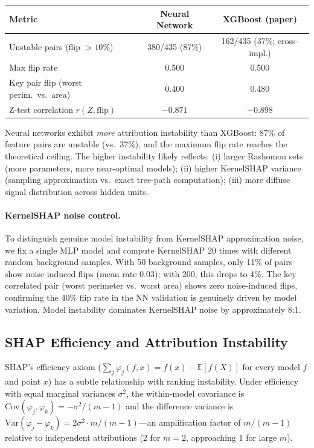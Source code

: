 \documentclass{jmlr}
\newcommand{\E}{\mathbb{E}}
\newcommand{\Var}{\mathrm{Var}}
\begin{document}
\begin{center}
\small
\begin{tabular}{@{}lcc@{}}
\toprule
Metric & Neural Network & XGBoost (paper) \\
\midrule
Unstable pairs (flip $> 10\%$) & 380/435 (87\%) & 162/435 (37\%; cross-impl.) \\
Max flip rate & 0.500 & 0.500 \\
Key pair flip (worst perim.\ vs.\ area) & 0.400 & 0.480 \\
Z-test correlation $r(Z, \text{flip})$ & $-0.871$ & $-0.898$ \\
\bottomrule
\end{tabular}
\end{center}

Neural networks exhibit \emph{more} attribution instability than XGBoost: 87\% of feature pairs are unstable (vs.\ 37\%), and the maximum flip rate reaches the theoretical ceiling. The higher instability likely reflects: (i) larger Rashomon sets (more parameters, more near-optimal models); (ii) higher KernelSHAP variance (sampling approximation vs.\ exact tree-path computation); (iii) more diffuse signal distribution across hidden units.

\paragraph{KernelSHAP noise control.}
To distinguish genuine model instability from KernelSHAP approximation noise, we fix a single MLP model and compute KernelSHAP 20 times with different random background samples. With 50 background samples, only 11\% of pairs show noise-induced flips (mean rate 0.03); with 200, this drops to 4\%. The key correlated pair (worst perimeter vs.\ worst area) shows zero noise-induced flips, confirming the 40\% flip rate in the NN validation is genuinely driven by model variation. Model instability dominates KernelSHAP noise by approximately 8:1.

\subsection{SHAP Efficiency and Attribution Instability}

SHAP's efficiency axiom ($\sum_j \varphi_j(f,x) = f(x) - \E[f(X)]$ for every model $f$ and point $x$) has a subtle relationship with ranking instability. Under efficiency with equal marginal variances $\sigma^2$, the within-model covariance is $\text{Cov}(\varphi_j, \varphi_k) = -\sigma^2/(m-1)$ and the difference variance is $\Var(\varphi_j - \varphi_k) = 2\sigma^2 \cdot m/(m-1)$---an amplification factor of $m/(m-1)$ relative to independent attributions ($2$ for $m=2$, approaching $1$ for large $m$).
\end{document}
